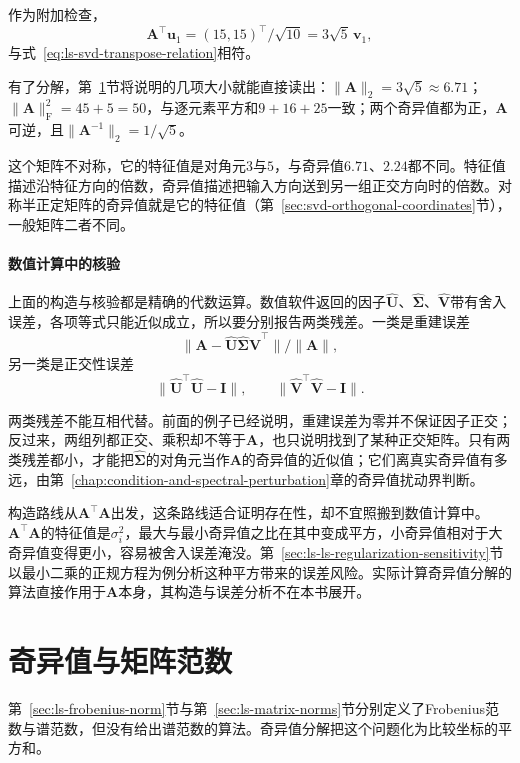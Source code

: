 \begin{example}[二阶矩阵的奇异值分解与核验]
作为附加检查，
\[
 \bm A^\top\bm u_1=(15,15)^\top/\sqrt{10}=3\sqrt5\,\bm v_1 ,
\]
与式~\eqref{eq:ls-svd-transpose-relation}相符。

有了分解，第~\ref{sec:ls-svd-matrix-size}节将说明的几项大小就能直接读出：$\lVert\bm A\rVert_2=3\sqrt5\approx6.71$；$\lVert\bm A\rVert_{\mathrm F}^2=45+5=50$，与逐元素平方和$9+16+25$一致；两个奇异值都为正，$\bm A$可逆，且$\lVert\bm A^{-1}\rVert_2=1/\sqrt5$。
\end{example}

这个矩阵不对称，它的特征值是对角元$3$与$5$，与奇异值$6.71$、$2.24$都不同。特征值描述沿特征方向的倍数，奇异值描述把输入方向送到另一组正交方向时的倍数。对称半正定矩阵的奇异值就是它的特征值（第~\ref{sec:svd-orthogonal-coordinates}节），一般矩阵二者不同。

\paragraph{数值计算中的核验}

上面的构造与核验都是精确的代数运算。数值软件返回的因子$\widehat{\bm U}$、$\widehat{\bm\Sigma}$、$\widehat{\bm V}$带有舍入误差，各项等式只能近似成立，所以要分别报告两类残差。一类是重建误差
\[
 \lVert\bm A-\widehat{\bm U}\widehat{\bm\Sigma}\widehat{\bm V}^\top\rVert/\lVert\bm A\rVert ,
\]
另一类是正交性误差
\[
 \lVert\widehat{\bm U}^\top\widehat{\bm U}-\bm I\rVert,\qquad\lVert\widehat{\bm V}^\top\widehat{\bm V}-\bm I\rVert .
\]

两类残差不能互相代替。前面的例子已经说明，重建误差为零并不保证因子正交；反过来，两组列都正交、乘积却不等于$\bm A$，也只说明找到了某种正交矩阵。只有两类残差都小，才能把$\widehat{\bm\Sigma}$的对角元当作$\bm A$的奇异值的近似值；它们离真实奇异值有多远，由第~\ref{chap:condition-and-spectral-perturbation}章的奇异值扰动界判断。

构造路线从$\bm A^\top\bm A$出发，这条路线适合证明存在性，却不宜照搬到数值计算中。$\bm A^\top\bm A$的特征值是$\sigma_i^2$，最大与最小奇异值之比在其中变成平方，小奇异值相对于大奇异值变得更小，容易被舍入误差淹没。第~\ref{sec:ls-ls-regularization-sensitivity}节以最小二乘的正规方程为例分析这种平方带来的误差风险。实际计算奇异值分解的算法直接作用于$\bm A$本身，其构造与误差分析不在本书展开。

\section{奇异值与矩阵范数}
\label{sec:ls-svd-matrix-size}

第~\ref{sec:ls-frobenius-norm}节与第~\ref{sec:ls-matrix-norms}节分别定义了Frobenius范数与谱范数，但没有给出谱范数的算法。奇异值分解把这个问题化为比较坐标的平方和。

